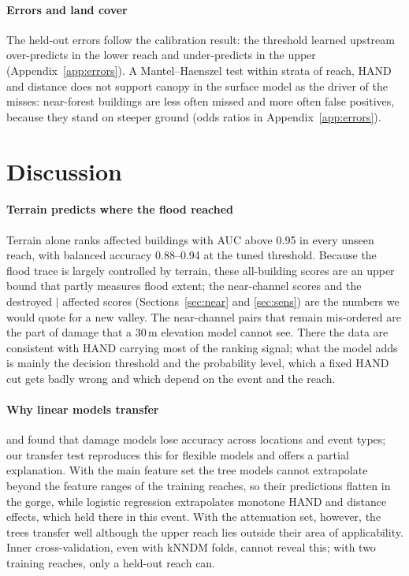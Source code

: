 \documentclass[journal,a4paper]{IEEEtran}
\begin{document}
\paragraph{Errors and land cover} The held-out errors follow the calibration result: the threshold learned upstream over-predicts in the lower reach and under-predicts in the upper (Appendix~\ref{app:errors}). A Mantel--Haenszel test within strata of reach, HAND and distance does not support canopy in the surface model as the driver of the misses: near-forest buildings are less often missed and more often false positives, because they stand on steeper ground (odds ratios in Appendix~\ref{app:errors}).

\section{Discussion}\label{sec:discussion}

\paragraph{Terrain predicts where the flood reached} Terrain alone ranks affected buildings with AUC above 0.95 in every unseen reach, with balanced accuracy 0.88--0.94 at the tuned threshold. Because the flood trace is largely controlled by terrain, these all-building scores are an upper bound that partly measures flood extent; the near-channel scores and the destroyed $\mid$ affected scores (Sections~\ref{sec:near} and \ref{sec:sens}) are the numbers we would quote for a new valley. The near-channel pairs that remain mis-ordered are the part of damage that a 30\,m elevation model cannot see. There the data are consistent with HAND carrying most of the ranking signal; what the model adds is mainly the decision threshold and the probability level, which a fixed HAND cut gets badly wrong and which depend on the event and the reach.

\paragraph{Why linear models transfer} \citet{paulik2023} and \citet{currie2026} found that damage models lose accuracy across locations and event types; our transfer test reproduces this for flexible models and offers a partial explanation. With the main feature set the tree models cannot extrapolate beyond the feature ranges of the training reaches, so their predictions flatten in the gorge, while logistic regression extrapolates monotone HAND and distance effects, which held there in this event. With the attenuation set, however, the trees transfer well although the upper reach lies outside their area of applicability. Inner cross-validation, even with kNNDM folds, cannot reveal this; with two training reaches, only a held-out reach can.
\end{document}
